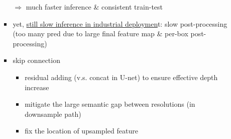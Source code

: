 \begin{itemize}
\begin{itemize}
\begin{itemize}
		$\Rightarrow$ much faster inference \& consistent train-test
		\item yet, \underline{still slow inference in industrial deploymen}t: slow post-processing  \\
		(too many pred due to large final feature map \& per-box post-processing)
		\item skip connection
			\begin{itemize}
			\item residual adding (v.s. concat in U-net) to ensure effective depth increase
			\item mitigate the large semantic gap between resolutions (in downsample path)
			\item fix the location of upsampled feature
			\end{itemize}
		\end{itemize}
	\end{itemize}


\end{itemize}
